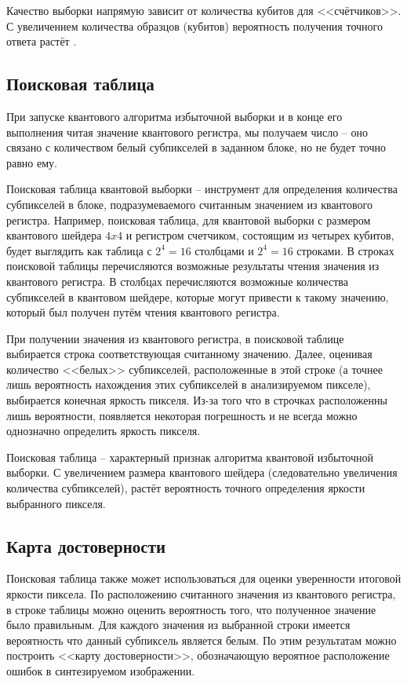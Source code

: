 Качество выборки напрямую зависит от количества кубитов для <<счётчиков>>. С увеличением количества образцов (кубитов) вероятность получения точного ответа растёт \cite{PQC}.

\subsection{Поисковая таблица}

При запуске квантового алгоритма избыточной выборки и в конце его выполнения читая значение квантового регистра, мы получаем число -- оно связано с количеством белый субпикселей в заданном блоке, но не будет точно равно ему. 

Поисковая таблица квантовой выборки -- инструмент для определения количества субпикселей в блоке, подразумеваемого считанным значением из квантового регистра. Например, поисковая таблица, для квантовой выборки с размером квантового шейдера $4x4$ и регистром счетчиком, состоящим из четырех кубитов, будет выглядить как таблица с $2^4 = 16$ столбцами и $2^4 = 16$ строками. В строках поисковой таблицы перечисляются возможные результаты чтения значения из квантового регистра. В столбцах перечисляются возможные количества  субпикселей в квантовом шейдере, которые могут привести к такому значению, который был получен путём чтения квантового регистра.

При получении значения из квантового регистра, в поисковой таблице выбирается строка соответствующая считанному значению. Далее, оценивая количество <<белых>> субпикселей, расположенные в этой строке (а точнее лишь вероятность нахождения этих субпикселей в анализируемом пикселе), выбирается конечная яркость пикселя. Из-за того что в строчках расположенны лишь вероятности, появляется некоторая погрешность и не всегда можно  однозначно определить яркость пикселя.

Поисковая таблица -- характерный признак алгоритма квантовой избыточной выборки. С увеличением размера квантового шейдера (следовательно увеличения количества субпикселей), растёт вероятность точного определения яркости выбранного пикселя.

\subsection{Карта достоверности}

Поисковая таблица также может использоваться для оценки уверенности итоговой яркости пиксела. По расположению считанного значения из квантового регистра, в строке таблицы можно оценить вероятность того, что полученное значение было правильным. Для каждого значения из выбранной строки имеется вероятность что данный субпиксель является белым. По этим результатам можно построить <<карту достоверности>>, обозначающую вероятное расположение ошибок в синтезируемом изображении.

